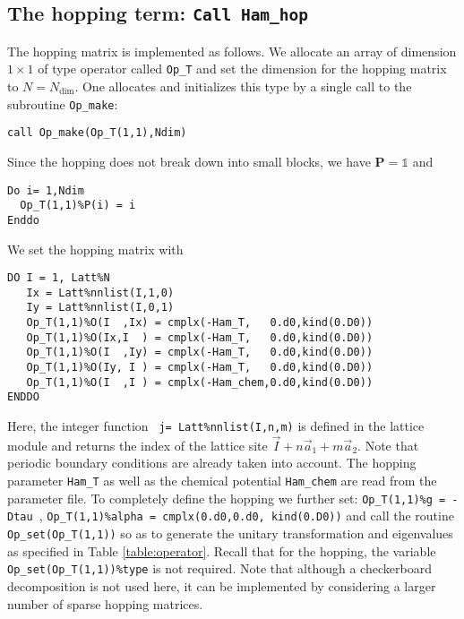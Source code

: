 \subsection{The hopping term: \texttt{Call Ham\_hop}}

The hopping matrix is implemented as follows. 
We allocate an array of dimension $1\times 1$ of type operator  called \texttt{Op\_T} and set the  dimension for the hopping  matrix to $N=N_{\mathrm{dim}}$. One  allocates and initializes this type by a single call to the subroutine \texttt{Op\_make}: 
\begin{lstlisting}[style=fortran]
call Op_make(Op_T(1,1),Ndim)
\end{lstlisting}
Since the hopping  does not  break down into small blocks, we have ${\bm P}=\mathds{1}$   and  
\begin{lstlisting}[style=fortran]
Do i= 1,Ndim
  Op_T(1,1)%P(i) = i
Enddo
\end{lstlisting}
We set the hopping matrix  with 
\begin{lstlisting}[style=fortran]
DO I = 1, Latt%N
   Ix = Latt%nnlist(I,1,0)
   Iy = Latt%nnlist(I,0,1)
   Op_T(1,1)%O(I  ,Ix) = cmplx(-Ham_T,   0.d0,kind(0.D0))
   Op_T(1,1)%O(Ix,I  ) = cmplx(-Ham_T,   0.d0,kind(0.D0))
   Op_T(1,1)%O(I  ,Iy) = cmplx(-Ham_T,   0.d0,kind(0.D0))
   Op_T(1,1)%O(Iy, I ) = cmplx(-Ham_T,   0.d0,kind(0.D0))
   Op_T(1,1)%O(I  ,I ) = cmplx(-Ham_chem,0.d0,kind(0.D0))
ENDDO
\end{lstlisting}
Here, the integer function \texttt{  j=  Latt\%nnlist(I,n,m)} is defined in the lattice module and returns the index of the lattice site $ \vec{I} +  n \vec{a}_1 +  m \vec{a}_2$.
Note that periodic boundary conditions are 
already taken into account.  The hopping parameter \texttt{Ham\_T} as well as the chemical potential \texttt{Ham\_chem} are read from the parameter file.  
To completely define the hopping  we further set: \texttt{Op\_T(1,1)\%g = -Dtau }, \texttt{Op\_T(1,1)\%alpha = cmplx(0.d0,0.d0, kind(0.D0))} and call the routine  \texttt{Op\_set(Op\_T(1,1))}  so as to generate  the unitary transformation and eigenvalues as specified in Table \ref{table:operator}.  Recall that for the hopping, the variable  \texttt{Op\_set(Op\_T(1,1))\%type}  is not  required. 
Note that although a checkerboard decomposition is not  used here,  it can be implemented by considering a larger number of sparse hopping matrices.  


